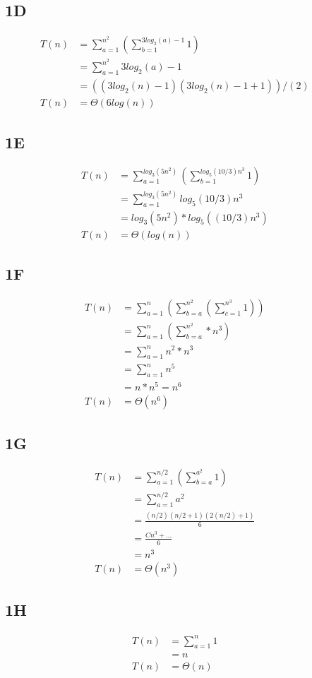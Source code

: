 \documentclass[14pt]{extarticle}
\begin{document}
\subsection*{1D}
\begin{align*}
T(n) &= \sum_{a=1}^{n^2}(\sum_{b=1}^{3log_2(a) - 1}1) && \text{}  \\
&= \sum_{a=1}^{n^2}3log_2(a) - 1 \\
&= ((3log_2(n) - 1)(3log_2(n) - 1 + 1))/(2)\\
T(n) &= \Theta(6log(n))
\end{align*}
\subsection*{1E}
\begin{align*}
T(n) &= \sum_{a=1}^{log_3(5n^2)}(\sum_{b=1}^{log_5(10/3)n^3}1) && \text{}  \\
&= \sum_{a=1}^{log_3(5n^2)} log_5(10/3)n^3 && \text{}  \\
&= log_3(5n^2) * log_5((10/3)n^3) \\
T(n) &= \Theta(log(n))
\end{align*}
\subsection*{1F}
\begin{align*}
T(n) &= \sum_{a=1}^{n}(\sum_{b=a}^{n^2}(\sum_{c=1}^{n^3}1)) && \text{}  \\
&= \sum_{a=1}^{n}(\sum_{b=a}^{n^2}* n^3) \\
&= \sum_{a=1}^{n} n^2 * n^3 \\
&= \sum_{a=1}^{n} n^5 \\
&= n *n^5 = n^6 \\
T(n) &= \Theta(n^6)
\end{align*}
\subsection*{1G}
\begin{align*}
T(n) &= \sum_{a=1}^{n/2}(\sum_{b=a}^{a^2}1) && \text{}  \\
&= \sum_{a=1}^{n/2}a^2 && \text{} \\
&= \frac{(n/2)(n/2+1)(2(n/2)+1)}{6} \\
&= \frac{Cn^3 + ...}{6} \\
&= n^3 \\
T(n) &= \Theta(n^3)
\end{align*} 
\subsection*{1H}
\begin{align*}
T(n) &= \sum_{a=1}^{n}1 && \text{} \\
&= n && \text{} \\
T(n) &= \Theta(n)
\end{align*} 
\end{document}
